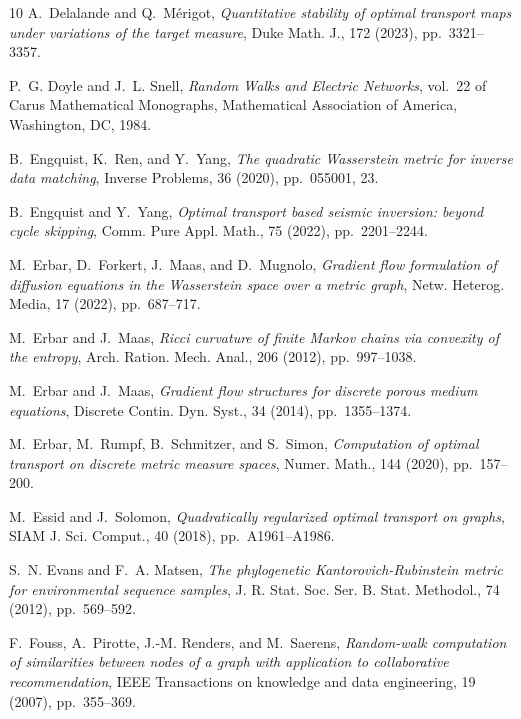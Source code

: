 \documentclass[11pt,a4paper]{article}
\begin{document}
\begin{thebibliography}{10}
    {\sc A.~Delalande and Q.~M\'erigot}, {\em Quantitative stability of optimal transport maps under variations of the target measure}, Duke Math. J., 172 (2023), pp.~3321--3357.

    {\sc P.~G. Doyle and J.~L. Snell}, {\em Random Walks and Electric Networks}, vol.~22 of Carus Mathematical Monographs, Mathematical Association of America, Washington, DC, 1984.

    {\sc B.~Engquist, K.~Ren, and Y.~Yang}, {\em The quadratic {W}asserstein metric for inverse data matching}, Inverse Problems, 36 (2020), pp.~055001, 23.

    {\sc B.~Engquist and Y.~Yang}, {\em Optimal transport based seismic inversion: beyond cycle skipping}, Comm. Pure Appl. Math., 75 (2022), pp.~2201--2244.

    {\sc M.~Erbar, D.~Forkert, J.~Maas, and D.~Mugnolo}, {\em Gradient flow formulation of diffusion equations in the {W}asserstein space over a metric graph}, Netw. Heterog. Media, 17 (2022), pp.~687--717.

    {\sc M.~Erbar and J.~Maas}, {\em Ricci curvature of finite {M}arkov chains via convexity of the entropy}, Arch. Ration. Mech. Anal., 206 (2012), pp.~997--1038.

    {\sc M.~Erbar and J.~Maas}, {\em Gradient flow structures for discrete porous medium equations}, Discrete Contin. Dyn. Syst., 34 (2014), pp.~1355--1374.

    {\sc M.~Erbar, M.~Rumpf, B.~Schmitzer, and S.~Simon}, {\em Computation of optimal transport on discrete metric measure spaces}, Numer. Math., 144 (2020), pp.~157--200.

    {\sc M.~Essid and J.~Solomon}, {\em Quadratically regularized optimal transport on graphs}, SIAM J. Sci. Comput., 40 (2018), pp.~A1961--A1986.

    {\sc S.~N. Evans and F.~A. Matsen}, {\em The phylogenetic {K}antorovich-{R}ubinstein metric for environmental sequence samples}, J. R. Stat. Soc. Ser. B. Stat. Methodol., 74 (2012), pp.~569--592.

    {\sc F.~Fouss, A.~Pirotte, J.-M. Renders, and M.~Saerens}, {\em Random-walk computation of similarities between nodes of a graph with application to collaborative recommendation}, IEEE Transactions on knowledge and data engineering, 19 (2007), pp.~355--369.


\end{thebibliography}
\end{document}
